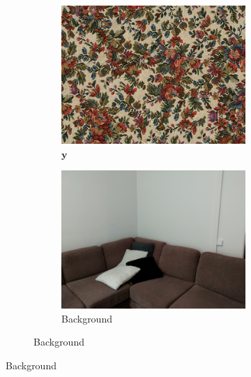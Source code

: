 \begin{figure}[]
    \centering    
    \begin{subfigure}{\textwidth}
        \centering
        \begin{subfigure}{0.24\textwidth}
            \centering
            \includegraphics[width=\textwidth]{images/04-experiment02/sofa/flowers/target.jpg}
            \caption*{\(\bm{y}\)}
        \end{subfigure}
        \hfill
        \begin{subfigure}{0.24\textwidth}
            \centering
            \includegraphics[width=\textwidth]{images/04-experiment02/sofa/bg.jpg}
            \caption*{Background}

\end{subfigure}
\end{subfigure}
\end{figure}

